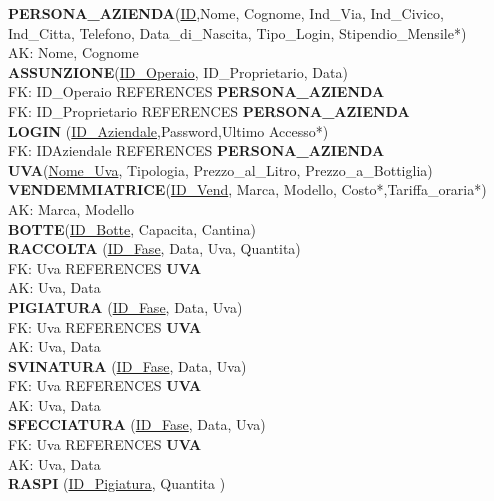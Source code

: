 \documentclass{article}
\begin{document}
\textbf{PERSONA\_AZIENDA}(\underline{ID},Nome, Cognome, Ind\_Via, Ind\_Civico, Ind\_Citta, Telefono, Data\_di\_Nascita, Tipo\_Login, Stipendio\_Mensile*)\\
AK: Nome, Cognome\\\newline
\textbf{ASSUNZIONE}(\underline{ID\_Operaio}, ID\_Proprietario, Data)\\
FK: ID\_Operaio REFERENCES \textbf{PERSONA\_AZIENDA}\\
FK: ID\_Proprietario REFERENCES \textbf{PERSONA\_AZIENDA}\\\newline
\textbf{LOGIN }(\underline{ID\_Aziendale},Password,Ultimo Accesso*)\\
FK: IDAziendale REFERENCES \textbf{PERSONA\_AZIENDA}\\\newline
\textbf{UVA}(\underline{Nome\_Uva}, Tipologia, Prezzo\_al\_Litro, Prezzo\_a\_Bottiglia)\\\newline
\textbf{VENDEMMIATRICE}(\underline{ID\_Vend}, Marca, Modello, Costo*,Tariffa\_oraria*)\\
AK: Marca, Modello\\\newline
\textbf{BOTTE}(\underline{ID\_Botte}, Capacita, Cantina)\\\newline
\textbf{RACCOLTA }(\underline{ID\_Fase}, Data, Uva, Quantita)\\
FK: Uva REFERENCES \textbf{UVA}\\
AK: Uva, Data \\\newline
\textbf{PIGIATURA }(\underline{ID\_Fase}, Data, Uva)\\
FK: Uva REFERENCES \textbf{UVA}\\
AK: Uva, Data \\\newline
\textbf{SVINATURA }(\underline{ID\_Fase}, Data, Uva)\\
FK: Uva REFERENCES \textbf{UVA}\\
AK: Uva, Data \\\newline
\textbf{SFECCIATURA }(\underline{ID\_Fase}, Data, Uva)\\
FK: Uva REFERENCES \textbf{UVA}\\
AK: Uva, Data \\\newline
\textbf{RASPI }(\underline{ID\_Pigiatura}, Quantita )\\
\end{document}
